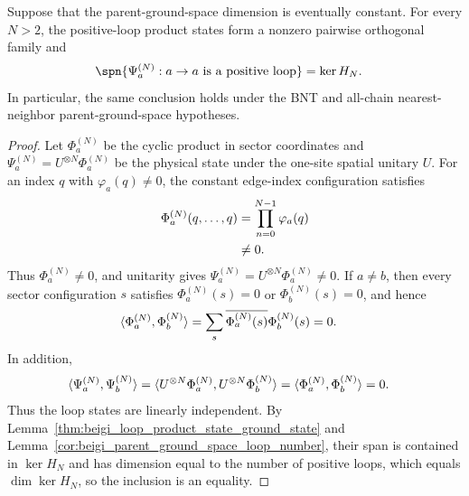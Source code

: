 \begin{lemma}
    \label{thm:beigi_loop_product_states_span_ground_space}
    \leanok
    Suppose that the parent-ground-space dimension is eventually constant.
    For every $N>2$, the positive-loop product states form a nonzero pairwise
    orthogonal family and
    \begin{align}
        \spn\{\Psi_a^{(N)}:a\to a\text{ is a positive loop}\}
         & =
        \ker H_N. \notag
    \end{align}
    In particular, the same conclusion holds under the BNT and all-chain
    nearest-neighbor parent-ground-space hypotheses.
\end{lemma}

\begin{proof}\leanok
    Let $\Phi_a^{(N)}$ be the cyclic product in sector coordinates and
    $\Psi_a^{(N)}=U^{\otimes N}\Phi_a^{(N)}$ be the physical state under the
    one-site spatial unitary $U$. For an index $q$ with
    $\varphi_a(q)\ne0$, the constant edge-index configuration satisfies
    \begin{align}
        \Phi_a^{(N)}(q,\ldots,q)
         & =
        \prod_{n=0}^{N-1}\varphi_a(q) \notag \\
         & \ne
        0. \notag
    \end{align}
    Thus $\Phi_a^{(N)}\ne0$, and unitarity gives
    $\Psi_a^{(N)}=U^{\otimes N}\Phi_a^{(N)}\ne0$. If $a\ne b$, then every
    sector configuration $s$ satisfies $\Phi_a^{(N)}(s)=0$ or
    $\Phi_b^{(N)}(s)=0$, and hence
    \begin{align}
        \langle\Phi_a^{(N)},\Phi_b^{(N)}\rangle
         & =
        \sum_s\overline{\Phi_a^{(N)}(s)} \Phi_b^{(N)}(s) =
        0. \notag
    \end{align}
    In addition,
    \begin{align}
        \langle\Psi_a^{(N)},\Psi_b^{(N)}\rangle
         & =
        \langle U^{\otimes N}\Phi_a^{(N)},
        U^{\otimes N}\Phi_b^{(N)}\rangle =
        \langle\Phi_a^{(N)},\Phi_b^{(N)}\rangle =
        0. \notag
    \end{align}
    Thus the loop states are linearly independent. By
    Lemma~\ref{thm:beigi_loop_product_state_ground_state} and
    Lemma~\ref{cor:beigi_parent_ground_space_loop_number}, their span is
    contained in $\ker H_N$ and has dimension equal to the number of positive
    loops, which equals $\dim\ker H_N$, so the inclusion is an equality.
\end{proof}

